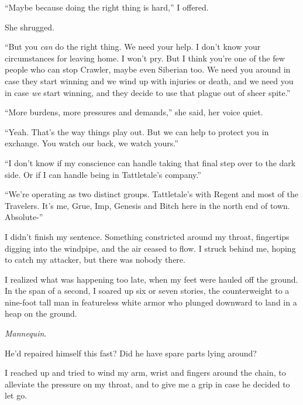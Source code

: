 ``Maybe because doing the right thing is hard,'' I offered.



She shrugged.



``But you \emph{can} do the right thing.  We need your help.  I don't know your circumstances for leaving home.  I won't pry.  But I think you're one of the few people who can stop Crawler, maybe even Siberian too.  We need you around in case they start winning and we wind up with injuries or death, and we need you in case \emph{we} start winning, and they decide to use that plague out of sheer spite.''



``More burdens, more pressures and demands,'' she said, her voice quiet.



``Yeah.  That's the way things play out.  But we can help to protect you in exchange.  You watch our back, we watch yours.''



``I don't know if my conscience can handle taking that final step over to the dark side.  Or if I can handle being in Tattletale's company.''



``We're operating as two distinct groups.  Tattletale's with Regent and most of the Travelers.  It's me, Grue, Imp, Genesis and Bitch here in the north end of town.  Absolute-''



I didn't finish my sentence.  Something constricted around my throat, fingertips digging into the windpipe, and the air ceased to flow.  I struck behind me, hoping to catch my attacker, but there was nobody there.



I realized what was happening too late, when my feet were hauled off the ground.  In the span of a second, I soared up six or seven stories, the counterweight to a nine-foot tall man in featureless white armor who plunged downward to land in a heap on the ground.



\emph{Mannequin}.



He'd repaired himself this fast?  Did he have spare parts lying around?



I reached up and tried to wind my arm, wrist and fingers around the chain, to alleviate the pressure on my throat, and to give me a grip in case he decided to let go.



